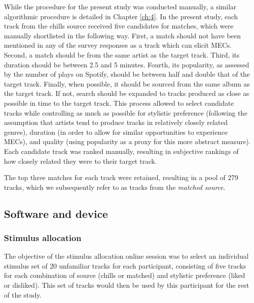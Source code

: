 While the procedure for the present study was conducted manually, a similar algorithmic procedure is detailed in Chapter \ref{ch:4}. In the present study, each track from the chills source received five candidates for matches, which were manually shortlisted in the following way. First, a match should not have been mentioned in any of the survey responses as a track which can elicit MECs. Second, a match should be from the same artist as the target track. Third, its duration should be between 2.5 and 5 minutes. Fourth, its popularity, as assessed by the number of plays on Spotify, should be between half and double that of the target track. Finally, when possible, it should be sourced from the same album as the target track. If not, search should be expanded to tracks produced as close as possible in time to the target track. This process allowed to select candidate tracks while controlling as much as possible for stylistic preference (following the assumption that artists tend to produce tracks in relatively closely related genres), duration (in order to allow for similar opportunities to experience MECs), and quality (using popularity as a proxy for this more abstract measure). Each candidate track was ranked manually, resulting in subjective rankings of how closely related they were to their target track.

The top three matches for each track were retained, resulting in a pool of 279 tracks, which we subsequently refer to as tracks from the \emph{matched source}.

\subsection{Software and device}

\subsubsection{Stimulus allocation}

The objective of the stimulus allocation online session was to select an individual stimulus set of 20 unfamiliar tracks for each participant, consisting of five tracks for each combination of source (chills or matched) and stylistic preference (liked or disliked). This set of tracks would then be used by this participant for the rest of the study.

